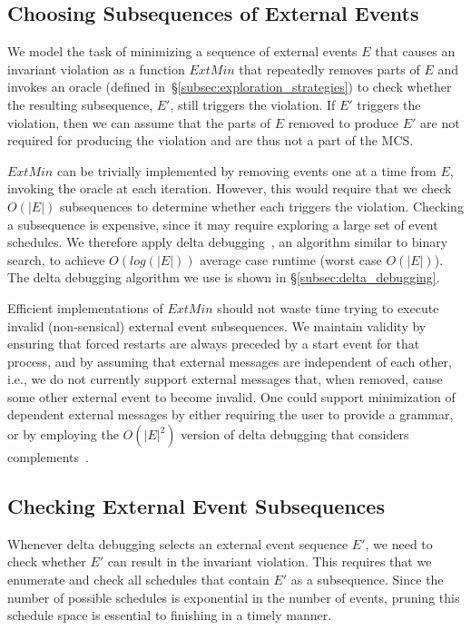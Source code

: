 \subsection{Choosing Subsequences of External Events}

We model the task of minimizing a sequence of external events $E$ that causes an invariant violation
as a function $ExtMin$ that repeatedly removes parts of $E$ and invokes an
oracle (defined in~\S\ref{subsec:exploration_strategies})
to check whether the resulting subsequence, $E'$, still triggers the violation. If $E'$ triggers the
violation, then we can assume that the parts of $E$ removed to produce $E'$ are not required
for producing the violation and are thus not a part of the MCS.

$ExtMin$ can be trivially implemented by removing events one at a time
from $E$, invoking the oracle at each iteration. However, this would require that we check
$O(|E|)$ subsequences to determine whether each triggers the violation.
Checking a subsequence
is expensive, since it may require exploring a large set of event schedules.
We therefore apply
delta debugging~\cite{Zeller:1999:YMP:318773.318946,Zeller:2002:SIF:506201.506206}, an algorithm similar to
binary search, to achieve $O(log(|E|))$ average case runtime (worst case
$O(|E|)$). The delta debugging algorithm we use is shown in
\S\ref{subsec:delta_debugging}.

Efficient implementations of $ExtMin$ should not waste time trying to execute invalid
(non-sensical) external event subsequences. We maintain validity by
ensuring that forced restarts are always preceded by a start
event for that process, and by assuming that external
messages are independent of each other, i.e., we do not currently support external messages that, when removed, cause some
other external event to become invalid. One could support minimization of
dependent external messages by either requiring the user to provide a grammar,
or by employing the $O(|E|^2)$ version of delta debugging that considers
complements~\cite{Zeller:2002:SIF:506201.506206}.

\subsection{Checking External Event Subsequences}

Whenever delta debugging selects an external event sequence $E'$, we need to check
whether $E'$ can result in the invariant violation. This requires that we enumerate
and check all schedules that contain $E'$ as a subsequence.
Since the number of possible schedules is exponential in the number of events,
pruning this schedule space is essential to finishing in a timely manner.

